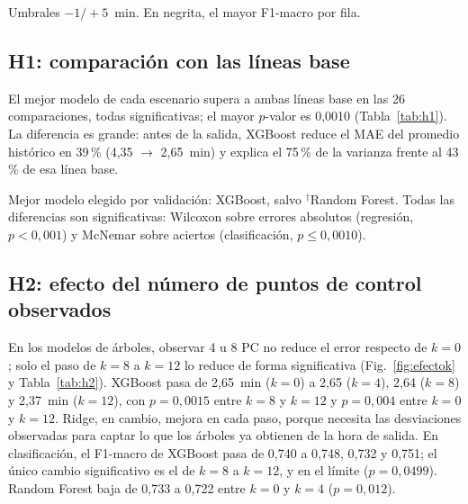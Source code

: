 \documentclass[conference]{IEEEtran}
\newcommand{\tablesize}{\fontsize{7}{8.4}\selectfont}
\newcommand{\ajustar}[1]{%
  \sbox{\tabbox}{#1}%
  \ifdim\wd\tabbox>\columnwidth
    \typeout{AVISO-TABLA: tabla mas ancha que la columna (\the\wd\tabbox\space > \the\columnwidth); se reduce}%
    \resizebox{\columnwidth}{!}{\usebox{\tabbox}}%
  \else
    \usebox{\tabbox}%
  \fi}
\newcommand{\tabla}[1]{\tablesize\setlength{\tabcolsep}{2pt}\ajustar{}}
\begin{document}
\begin{table}[!t]
\centering
\caption{F1-macro / recall de ``retrasado'' en prueba}\label{tab:testf1}
\tabla{t_test_f1}

\vspace{2pt}\raggedright\scriptsize Umbrales $-1/+5$~min. En negrita, el mayor F1-macro por fila.
\end{table}

\subsection{H1: comparación con las líneas base}
El mejor modelo de cada escenario supera a ambas líneas base en las 26 comparaciones, todas significativas; el mayor $p$-valor es 0,0010 (Tabla~\ref{tab:h1}). La diferencia es grande: antes de la salida, XGBoost reduce el MAE del promedio histórico en 39\,\% (4,35 $\rightarrow$ 2,65~min) y explica el 75\,\% de la varianza frente al 43\,\% de esa línea base.

\begin{table}[!t]
\centering
\caption{Mejor modelo frente a las líneas base en prueba}\label{tab:h1}
\tabla{t_h1}

\vspace{2pt}\raggedright\scriptsize Mejor modelo elegido por validación: XGBoost, salvo $^\dagger$Random Forest. Todas las diferencias son significativas: Wilcoxon sobre errores absolutos (regresión, $p < 0{,}001$) y McNemar sobre aciertos (clasificación, $p \leq 0{,}0010$).
\end{table}

\subsection{H2: efecto del número de puntos de control observados}
En los modelos de árboles, observar 4 u 8 PC no reduce el error respecto de $k = 0$; solo el paso de $k = 8$ a $k = 12$ lo reduce de forma significativa (Fig.~\ref{fig:efectok} y Tabla~\ref{tab:h2}). XGBoost pasa de 2,65~min ($k = 0$) a 2,65 ($k = 4$), 2,64 ($k = 8$) y 2,37~min ($k = 12$), con $p = 0{,}0015$ entre $k = 8$ y $k = 12$ y $p = 0{,}004$ entre $k = 0$ y $k = 12$. Ridge, en cambio, mejora en cada paso, porque necesita las desviaciones observadas para captar lo que los árboles ya obtienen de la hora de salida. En clasificación, el F1-macro de XGBoost pasa de 0,740 a 0,748, 0,732 y 0,751; el único cambio significativo es el de $k = 8$ a $k = 12$, y en el límite ($p = 0{,}0499$). Random Forest baja de 0,733 a 0,722 entre $k = 0$ y $k = 4$ ($p = 0{,}012$).
\end{document}
